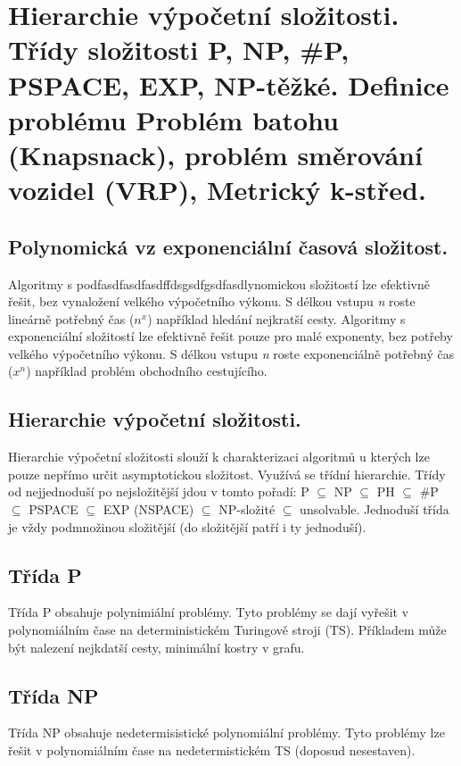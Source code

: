 \section{Hierarchie výpočetní složitosti. Třídy složitosti P, NP, \#P, PSPACE, EXP, NP-těžké. Definice problému Problém batohu (Knapsnack), problém směrování vozidel (VRP), Metrický k-střed.}

\subsection{Polynomická vz exponenciální časová složitost.}

Algoritmy s podfasdfasdfasdffdsgsdfgsdfasdlynomickou složitostí lze efektivně řešit, bez vynaložení velkého výpočetního výkonu. 
S délkou vstupu \textit{n} roste lineárně potřebný čas ($n^x$) například hledání nejkratší cesty. 
Algoritmy s exponenciální složitostí lze efektivně řešit pouze pro malé exponenty, bez potřeby velkého výpočetního výkonu. 
S délkou vstupu \textit{n} roste exponenciálně potřebný čas ($x^n$) například problém obchodního cestujícího.

\subsection{Hierarchie výpočetní složitosti.}

Hierarchie výpočetní složitosti slouží k charakterizaci algoritmů u kterých lze pouze nepřímo určit asymptotickou složitost. 
Využívá se třídní hierarchie. 
Třídy od nejjednoduší po nejsložitější jdou v tomto pořadí: P $\subseteq$ NP $\subseteq$ PH $\subseteq$ \#P $\subseteq$ PSPACE $\subseteq$ EXP (NSPACE) $\subseteq$ NP-složité $\subseteq$ unsolvable. 
Jednoduší třída je vždy podmnožinou složitější (do složitější patří i ty jednoduší).

\subsection{Třída P}

Třída P obsahuje polynimiální problémy. 
Tyto problémy se dají vyřešit v polynomiálním čase na deterministickém Turingově stroji (TS). 
Příkladem může být nalezení nejkdatší cesty, minimální kostry v grafu.

\subsection{Třída NP}

Třída NP obsahuje nedetermisistické polynomiální problémy. 
Tyto problémy lze řešit v polynomiálním čase na nedetermistickém TS (doposud nesestaven).


